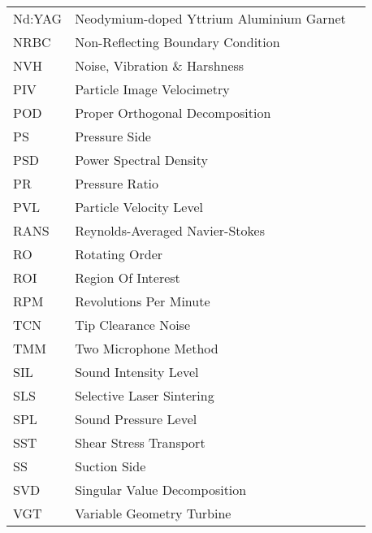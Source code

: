 \begin{longtable}{lll}
Nd:YAG & Neodymium-doped Yttrium Aluminium Garnet\\
NRBC & Non-Reflecting Boundary Condition \\
NVH & Noise, Vibration \& Harshness \\
PIV & Particle Image Velocimetry \\
POD & Proper Orthogonal Decomposition \\
PS & Pressure Side \\
PSD & Power Spectral Density \\
PR & Pressure Ratio \\
PVL & Particle Velocity Level \\
RANS & Reynolds-Averaged Navier-Stokes \\
RO & Rotating Order \\
ROI & Region Of Interest \\
RPM & Revolutions Per Minute \\
TCN & Tip Clearance Noise \\
TMM & Two Microphone Method \\
SIL & Sound Intensity Level \\
SLS & Selective Laser Sintering \\
SPL & Sound Pressure Level \\
SST & Shear Stress Transport \\
SS & Suction Side \\
SVD & Singular Value Decomposition \\
VGT & Variable Geometry Turbine \\
\end{longtable}

\normalsize